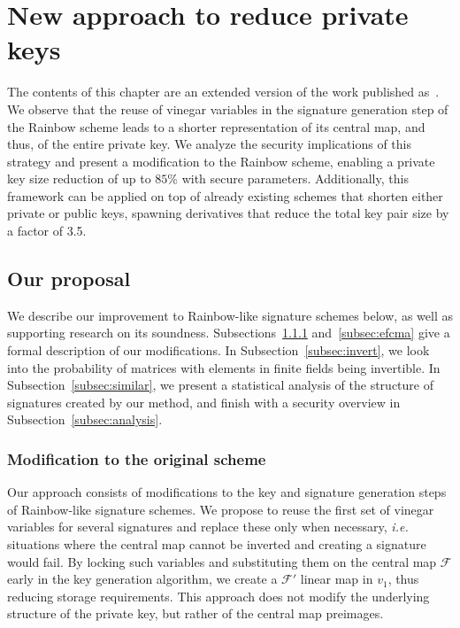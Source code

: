 \documentclass[draft, 12pt, a4paper, oneside]{memoir}
\theoremstyle{definition}
\begin{document}
\chapter{New approach to reduce private keys}\label{chapter:eta}

The contents of this chapter are an extended version of the work published as~\cite{Zambonin:201907}. We observe that the reuse of vinegar variables in the signature generation step of the Rainbow scheme leads to a shorter representation of its central map, and thus, of the entire private key. We analyze the security implications of this strategy and present a modification to the Rainbow scheme, enabling a private key size reduction of up to $85\%$ with secure parameters. Additionally, this framework can be applied on top of already existing schemes that shorten either private or public keys, spawning derivatives that reduce the total key pair size by a factor of 3.5.

\section{Our proposal}\label{sec:proposal}

We describe our improvement to Rainbow-like signature schemes below, as
well as supporting research on its soundness. Subsections~\ref{subsec:scheme}
and~\ref{subsec:efcma} give a formal description of our modifications. In
Subsection~\ref{subsec:invert}, we look into the probability of matrices with
elements in finite fields being invertible. In Subsection~\ref{subsec:similar},
we present a statistical analysis of the structure of signatures created by our
method, and finish with a security overview in
Subsection~\ref{subsec:analysis}.

\subsection{Modification to the original scheme}\label{subsec:scheme}

Our approach consists of modifications to the key and signature generation
steps of Rainbow-like signature schemes. We propose to reuse the first set of
vinegar variables for several signatures and replace these only when necessary,
\emph{i.e.} situations where the central map cannot be inverted and creating a
signature would fail. By locking such variables and substituting them on the
central map $\mathcal{F}$ early in the key generation algorithm, we create a
$\mathcal{F}'$ linear map in $v_{1}$, thus reducing storage requirements. This
approach does not modify the underlying structure of the private key, but
rather of the central map preimages.
\end{document}
